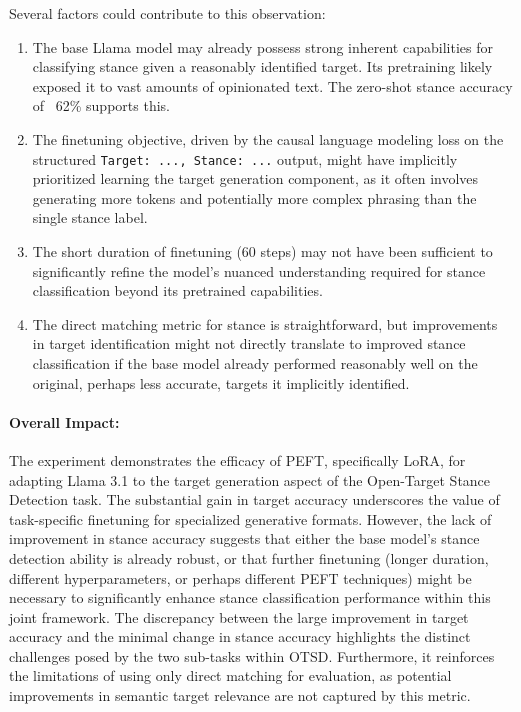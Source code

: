 \documentclass[twocolumn, 11pt,letterpaper]{article}
\begin{document}
Several factors could contribute to this observation:
\begin{enumerate}
    \item The base Llama model may already possess strong inherent capabilities for classifying stance given a reasonably identified target. Its pretraining likely exposed it to vast amounts of opinionated text. The zero-shot stance accuracy of ~62\% supports this.
    \item The finetuning objective, driven by the causal language modeling loss on the structured \texttt{Target: ..., Stance: ...} output, might have implicitly prioritized learning the target generation component, as it often involves generating more tokens and potentially more complex phrasing than the single stance label.
    \item The short duration of finetuning (60 steps) may not have been sufficient to significantly refine the model's nuanced understanding required for stance classification beyond its pretrained capabilities.
    \item The direct matching metric for stance is straightforward, but improvements in target identification might not directly translate to improved stance classification if the base model already performed reasonably well on the original, perhaps less accurate, targets it implicitly identified.
\end{enumerate}

\paragraph{Overall Impact:}
The experiment demonstrates the efficacy of PEFT, specifically LoRA, for adapting Llama 3.1 to the target generation aspect of the Open-Target Stance Detection task. The substantial gain in target accuracy underscores the value of task-specific finetuning for specialized generative formats. However, the lack of improvement in stance accuracy suggests that either the base model's stance detection ability is already robust, or that further finetuning (longer duration, different hyperparameters, or perhaps different PEFT techniques) might be necessary to significantly enhance stance classification performance within this joint framework. The discrepancy between the large improvement in target accuracy and the minimal change in stance accuracy highlights the distinct challenges posed by the two sub-tasks within OTSD. Furthermore, it reinforces the limitations of using only direct matching for evaluation, as potential improvements in semantic target relevance are not captured by this metric.
\end{document}
